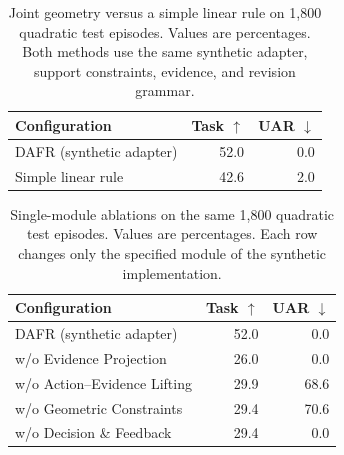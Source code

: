 \begin{table}[t]
\centering
\small
\setlength{\tabcolsep}{3pt}
\begin{tabular}{lrr}
\toprule
Configuration & Task $\uparrow$ & UAR $\downarrow$\\
\midrule
DAFR (synthetic adapter) & 52.0 & 0.0 \\
Simple linear rule & 42.6 & 2.0 \\
\bottomrule
\end{tabular}
\caption{Joint geometry versus a simple linear rule on 1,800 quadratic test episodes. Values are percentages. Both methods use the same synthetic adapter, support constraints, evidence, and revision grammar.}
\label{tab:synthetic-geometry}
\end{table}

\begin{table}[t]
\centering
\small
\setlength{\tabcolsep}{3pt}
\begin{tabular}{lrr}
\toprule
Configuration & Task $\uparrow$ & UAR $\downarrow$\\
\midrule
DAFR (synthetic adapter) & 52.0 & 0.0 \\
w/o Evidence Projection & 26.0 & 0.0 \\
w/o Action--Evidence Lifting & 29.9 & 68.6 \\
w/o Geometric Constraints & 29.4 & 70.6 \\
w/o Decision \& Feedback & 29.4 & 0.0 \\
\bottomrule
\end{tabular}
\caption{Single-module ablations on the same 1,800 quadratic test episodes. Values are percentages. Each row changes only the specified module of the synthetic implementation.}
\label{tab:synthetic-module-ablation}
\end{table}
